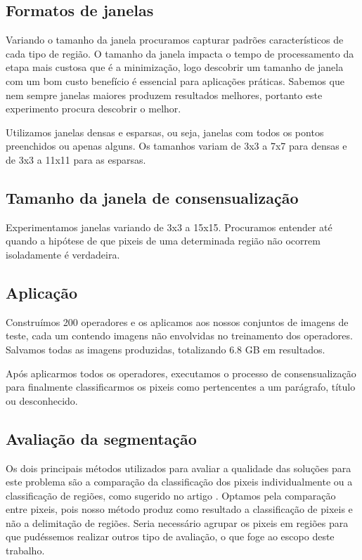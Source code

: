 \documentclass[a4paper,11pt]{article}
\begin{document}
  \subsection{Formatos de janelas}

    Variando o tamanho da janela procuramos capturar padrões característicos de cada tipo de região. O tamanho da janela impacta o tempo de processamento da etapa mais custosa que é a minimização, logo descobrir um tamanho de janela com um bom custo benefício é essencial para aplicações práticas. Sabemos que nem sempre janelas maiores produzem resultados melhores, portanto este experimento procura descobrir o melhor.

    Utilizamos janelas densas e esparsas, ou seja, janelas com todos os pontos preenchidos ou apenas alguns. Os tamanhos variam de 3x3 a 7x7 para densas e de 3x3 a 11x11 para as esparsas.

  \subsection{Tamanho da janela de consensualização}

    Experimentamos janelas variando de 3x3 a 15x15. Procuramos entender até quando a hipótese de que pixeis de uma determinada região não ocorrem isoladamente é verdadeira.

  \subsection{Aplicação}

    Construímos 200 operadores e os aplicamos aos nossos conjuntos de imagens de teste, cada um contendo imagens não envolvidas no treinamento dos operadores. Salvamos todas as imagens produzidas, totalizando 6.8 GB em resultados.

    Após aplicarmos todos os operadores, executamos o processo de consensualização para finalmente classificarmos os pixeis como pertencentes a um parágrafo, título ou desconhecido.

  \subsection{Avaliação da segmentação}

    Os dois principais métodos utilizados para avaliar a qualidade das soluções para este problema são a comparação da classificação dos pixeis individualmente ou a classificação de regiões, como sugerido no artigo \cite{10.1109/ICDAR.2007.207}.
    Optamos pela comparação entre pixeis, pois nosso método produz como resultado a classificação de pixeis e não a delimitação de regiões. Seria necessário agrupar os pixeis em regiões para que pudéssemos realizar outros tipo de avaliação, o que foge ao escopo deste trabalho.
\end{document}
